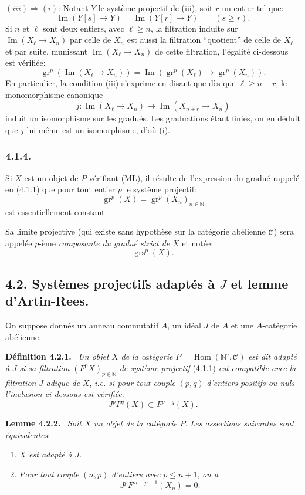 \documentclass[11pt]{article}
\newenvironment{statement}[1]{\par\medskip\noindent\textbf{#1.}\ }{\par\medskip}
\DeclareMathOperator{\Hom}{Hom}
\providecommand{\uHom}{\underline{\Hom}}
\providecommand{\gr}{\operatorname{gr}}
\providecommand{\Hom}{\operatorname{Hom}}
\providecommand{\Im}{\operatorname{Im}}
\providecommand{\gr}{\operatorname{gr}}
\renewcommand{\Im}{\operatorname{Im}}
\providecommand{\gr}{\operatorname{gr}}
\providecommand{\grs}{\operatorname{grs}}
\providecommand{\Im}{\operatorname{Im}}
\providecommand{\Hom}{\operatorname{Hom}}
\begin{document}
$(iii)\Rightarrow(i)$: Notant $Y$ le système projectif de (iii), soit $r$ un entier tel que:
\[
\Im(Y[s]\to Y)=\Im(Y[r]\to Y)\qquad(s\ge r).
\]
Si $n$ et $\ell$ sont deux entiers, avec $\ell\ge n$, la filtration induite sur $\Im(X_\ell\to X_n)$ par celle de $X_n$ est aussi la filtration ``quotient'' de celle de $X_\ell$ et par suite, munissant $\Im(X_\ell\to X_n)$ de cette filtration, l'égalité ci-dessous est vérifiée:
\[
\gr^p(\Im(X_\ell\to X_n))=
\Im(\gr^p(X_\ell)\to\gr^p(X_n)).
\]
En particulier, la condition (iii) s'exprime en disant que dès que $\ell\ge n+r$, le monomorphisme canonique
\[
j:\Im(X_\ell\to X_n)\longrightarrow\Im(X_{n+r}\to X_n)
\]
induit un isomorphisme sur les gradués. Les graduations étant finies, on en déduit que $j$ lui-même est un isomorphisme, d'où (i).


\subsubsection*{4.1.4.}
Si $X$ est un
objet de \(P\) vérifiant (ML), il résulte de l'expression du gradué rappelé en (4.1.1) que pour tout entier \(p\) le système projectif:
\[
\gr^p(X)=\gr^p(X_n)_{n\in\mathbb N}
\]
est essentiellement constant.

Sa limite projective (qui existe sans hypothèse sur la catégorie abélienne \(\mathcal C\)) sera appelée \(p\)-ème \emph{composante du gradué strict de} \(X\) et notée:
\[
\grs^p(X).
\]

\subsection*{4.2. Systèmes projectifs adaptés à \(J\) et lemme d'Artin-Rees.}

On suppose donnés un anneau commutatif \(A\), un idéal \(J\) de \(A\) et une \(A\)-catégorie abélienne.

\begin{statement}{Définition 4.2.1}
\emph{Un objet} \(X\) \emph{de la catégorie} \(P=\uHom(\mathbb N^\circ,\mathcal C)\) \emph{est dit adapté à} \(J\) \emph{si sa filtration} \((F^pX)_{p\in\mathbb N}\) \emph{de système projectif} (4.1.1) \emph{est compatible avec la filtration} \(J\)-\emph{adique de} \(X\), \emph{i.e. si pour tout couple} \((p,q)\) \emph{d'entiers positifs ou nuls l'inclusion ci-dessous est vérifiée}:
\[
J^pF^q(X)\subset F^{p+q}(X).
\]
\end{statement}

\begin{statement}{Lemme 4.2.2}
\emph{Soit} \(X\) \emph{un objet de la catégorie} \(P\). \emph{Les assertions suivantes sont équivalentes}:
\begin{enumerate}[label=\textup{(\roman*)}]
\item \(X\) \emph{est adapté à} \(J\).
\item \emph{Pour tout couple} \((n,p)\) \emph{d'entiers avec} \(p\le n+1\), \emph{on a}
\[
J^pF^{\,n-p+1}(X_n)=0 .
\]
\end{enumerate}
\end{statement}
\end{document}

